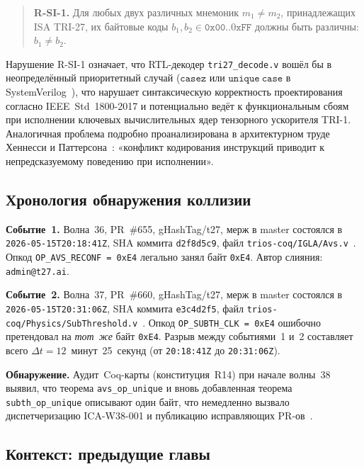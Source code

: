 \begin{quote}
\textbf{R-SI-1.}  Для любых двух различных мнемоник $m_1 \neq m_2$,
принадлежащих ISA TRI-27, их байтовые коды $b_1, b_2 \in \mathtt{0x00..0xFF}$
должны быть различны: $b_1 \neq b_2$.
\end{quote}

Нарушение R-SI-1 означает, что RTL-декодер \texttt{tri27\_decode.v}
вошёл бы в неопределённый приоритетный случай ($\mathtt{casez}$ или
$\mathtt{unique\ case}$ в SystemVerilog~\cite{ieee_sv_2017}), что
нарушает синтаксическую корректность проектирования согласно
IEEE~Std~1800-2017 и потенциально ведёт к функциональным сбоям при
исполнении ключевых вычислительных ядер тензорного ускорителя TRI-1.
Аналогичная проблема подробно проанализирована в архитектурном труде
Хеннесси и Паттерсона~\cite{hennessy_patterson_5ed}: «конфликт кодирования
инструкций приводит к непредсказуемому поведению при исполнении».

\subsection{Хронология обнаружения коллизии}

\textbf{Событие~1.}  Волна~36, PR~\#655, gHashTag/t27, мерж в master
состоялся в \texttt{2026-05-15T20:18:41Z}, SHA коммита \texttt{d2f8d5c9},
файл \texttt{trios-coq/IGLA/Avs.v}~\cite{pr655_t27}.  Опкод
\texttt{OP\_AVS\_RECONF = 0xE4} легально занял байт \texttt{0xE4}.
Автор слияния: \texttt{admin@t27.ai}.

\textbf{Событие~2.}  Волна~37, PR~\#660, gHashTag/t27, мерж в master
состоялся в \texttt{2026-05-15T20:31:06Z}, SHA коммита \texttt{e3c4d2f5},
файл \texttt{trios-coq/Physics/SubThreshold.v}~\cite{pr660_t27}.  Опкод
\texttt{OP\_SUBTH\_CLK = 0xE4} ошибочно претендовал на \emph{тот~же}
байт \texttt{0xE4}.  Разрыв между событиями~1 и~2 составляет всего
$\Delta t = 12$~минут~25~секунд (от \texttt{20:18:41Z} до
\texttt{20:31:06Z}).

\textbf{Обнаружение.}  Аудит~Coq-карты (конституция~R14) при начале
волны~38 выявил, что теорема \texttt{avs\_op\_unique} и вновь
добавленная теорема \texttt{subth\_op\_unique} описывают один байт,
что немедленно вызвало диспетчеризацию ICA-W38-001 и публикацию
исправляющих PR-ов~\cite{pr661_t27,pr_trinity_fpga_134,pr_trios_871,
pr_trios_874,pr_trios_875,pr_trios_877,pr_tt25,pr_tt26}.

\subsection{Контекст: предыдущие главы}

